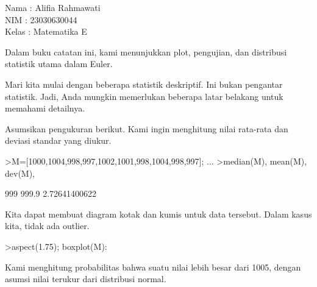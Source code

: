 \documentclass[a4paper,10pt]{article}
\begin{document}
\begin{eulernotebook}
\begin{eulercomment}
\begin{eulercomment}
\begin{eulercomment}
\begin{eulercomment}
\begin{eulercomment}
\begin{eulercomment}
\begin{eulercomment}
\begin{eulercomment}
\begin{eulercomment}
\begin{eulercomment}
\begin{eulercomment}
\begin{eulercomment}
\begin{eulercomment}
\begin{eulercomment}
\begin{eulercomment}
\begin{eulercomment}
\begin{eulercomment}
\begin{eulercomment}
\begin{eulercomment}
\begin{eulercomment}
\begin{eulercomment}
\begin{eulercomment}
\begin{eulercomment}
\begin{eulercomment}
\begin{eulercomment}
\begin{eulercomment}
\begin{eulercomment}
\begin{eulercomment}
\begin{eulercomment}
\begin{eulercomment}
\begin{euleroutput}
\end{euleroutput}
\eulersubheading{}
\begin{eulercomment}
Nama  : Alifia Rahmawati\\
NIM   : 23030630044\\
Kelas : Matematika E\\
\end{eulercomment}
\eulersubheading{}
\begin{eulercomment}
\begin{eulercomment}
\begin{eulercomment}
Dalam buku catatan ini, kami menunjukkan plot, pengujian, dan
distribusi statistik utama dalam Euler.

Mari kita mulai dengan beberapa statistik deskriptif. Ini bukan
pengantar statistik. Jadi, Anda mungkin memerlukan beberapa latar
belakang untuk memahami detailnya.

Asumsikan pengukuran berikut. Kami ingin menghitung nilai rata-rata
dan deviasi standar yang diukur.
\end{eulercomment}
\begin{eulerprompt}
>M=[1000,1004,998,997,1002,1001,998,1004,998,997]; ...
>median(M), mean(M), dev(M),
\end{eulerprompt}
\begin{euleroutput}
  999
  999.9
  2.72641400622
\end{euleroutput}
\begin{eulercomment}
Kita dapat membuat diagram kotak dan kumis untuk data tersebut. Dalam
kasus kita, tidak ada outlier.
\end{eulercomment}
\begin{eulerprompt}
>aspect(1.75); boxplot(M):
\end{eulerprompt}
\begin{eulercomment}
Kami menghitung probabilitas bahwa suatu nilai lebih besar dari 1005,
dengan asumsi nilai terukur dari distribusi normal.


\end{eulercomment}
\end{eulercomment}
\end{eulercomment}
\end{eulercomment}
\end{eulercomment}
\end{eulercomment}
\end{eulercomment}
\end{eulercomment}
\end{eulercomment}
\end{eulercomment}
\end{eulercomment}
\end{eulercomment}
\end{eulercomment}
\end{eulercomment}
\end{eulercomment}
\end{eulercomment}
\end{eulercomment}
\end{eulercomment}
\end{eulercomment}
\end{eulercomment}
\end{eulercomment}
\end{eulercomment}
\end{eulercomment}
\end{eulercomment}
\end{eulercomment}
\end{eulercomment}
\end{eulercomment}
\end{eulercomment}
\end{eulercomment}
\end{eulercomment}
\end{eulercomment}
\end{eulercomment}
\end{eulercomment}
\end{eulernotebook}
\end{document}
